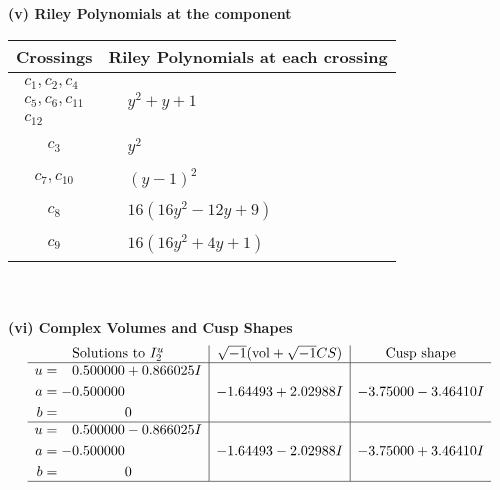 \documentclass[1p]{elsarticle_modified}
\theoremstyle{definition}
\newcommand{\I}{\sqrt{-1}}
\begin{document}
\newpage\renewcommand{\arraystretch}{1}
\flushleft \textbf{(v) Riley Polynomials at the component}\newline \\
\begin{tabular}{m{50pt}|m{274pt}}
Crossings & \hspace{64pt}Riley Polynomials at each crossing \\
\hline $$\begin{aligned}c_{1},c_{2},c_{4}\\c_{5},c_{6},c_{11}\\c_{12}\end{aligned}$$&$\begin{aligned}
&y^2+y+1
\end{aligned}$\\
\hline $$\begin{aligned}c_{3}\end{aligned}$$&$\begin{aligned}
&y^2
\end{aligned}$\\
\hline $$\begin{aligned}c_{7},c_{10}\end{aligned}$$&$\begin{aligned}
&(y-1)^2
\end{aligned}$\\
\hline $$\begin{aligned}c_{8}\end{aligned}$$&$\begin{aligned}
&16(16 y^2-12 y+9)
\end{aligned}$\\
\hline $$\begin{aligned}c_{9}\end{aligned}$$&$\begin{aligned}
&16(16 y^2+4 y+1)
\end{aligned}$\\
\hline
\end{tabular}\\~\\
\newpage\flushleft \textbf{(vi) Complex Volumes and Cusp Shapes}
$$\begin{array}{c|c|c}  
\text{Solutions to }I^u_{2}& \I (\text{vol} + \sqrt{-1}CS) & \text{Cusp shape}\\
 \hline 
\begin{aligned}
u &= \phantom{-}0.500000 + 0.866025 I \\
a &= -0.500000\phantom{ +0.000000I} \\
b &= \phantom{-0.000000 } 0\end{aligned}
 & -1.64493 + 2.02988 I & -3.75000 - 3.46410 I \\ \hline\begin{aligned}
u &= \phantom{-}0.500000 - 0.866025 I \\
a &= -0.500000\phantom{ +0.000000I} \\
b &= \phantom{-0.000000 } 0\end{aligned}
 & -1.64493 - 2.02988 I & -3.75000 + 3.46410 I\\
 \hline 
 \end{array}$$\newpage
\end{document}
